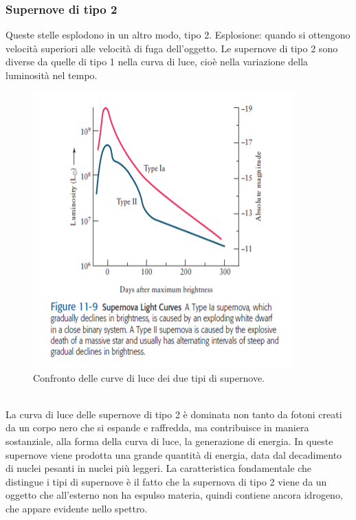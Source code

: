 \documentclass[a4paper,11pt]{article}
\begin{document}
\subsubsection{Supernove di tipo 2}
Queste stelle esplodono in un altro modo, tipo 2. Esplosione: quando si ottengono velocità superiori alle velocità di fuga dell'oggetto. Le supernove di tipo 2 sono diverse da quelle di tipo 1 nella curva di luce, cioè nella variazione della luminosità nel tempo. 
\begin{figure}[h!!]
        \centering
        \includegraphics[width=10cm]{lezione 28 novembre/supernovatipouno.png}
        \caption{Confronto delle curve di luce dei due tipi di supernove.}
        \label{lezione 28 novembre/supernovatipouno.png}
    \end{figure}
\\
La curva di luce delle supernove di tipo 2 è dominata non tanto da fotoni creati da un corpo nero che si espande e raffredda, ma contribuisce in maniera sostanziale, alla forma della curva di luce, la generazione di energia. In queste supernove viene prodotta una grande quantità di energia, data dal decadimento di nuclei pesanti in nuclei più leggeri. La caratteristica fondamentale che distingue i tipi di supernove è il fatto che la supernova di tipo 2 viene da un oggetto che all'esterno non ha espulso materia, quindi contiene ancora idrogeno, che appare evidente nello spettro. 
\end{document}

